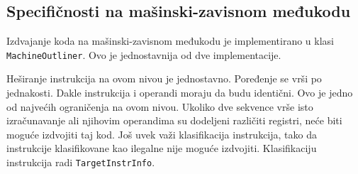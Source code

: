\documentclass[12pt,oneside]{memoir}
\begin{document}





\subsection{Specifičnosti na mašinski-zavisnom međukodu}


Izdvajanje koda na mašinski-zavisnom međukodu je implementirano u klasi \verb|MachineOutliner|.
Ovo je jednostavnija od dve implementacije.

Heširanje instrukcija na ovom nivou je jednostavno.
Poređenje se vrši po jednakosti.
Dakle instrukcija i operandi moraju da budu identični.
Ovo je jedno od najvećih ograničenja na ovom nivou.
Ukoliko dve sekvence vrše isto izračunavanje ali njihovim operandima su dodeljeni različiti registri, neće biti moguće izdvojiti taj kod.
Još uvek važi klasifikacija instrukcija, tako da instrukcije klasifikovane kao ilegalne nije moguće izdvojiti.
Klasifikaciju instrukcija radi \verb|TargetInstrInfo|.
\end{document}

